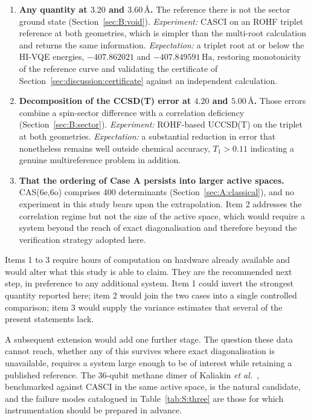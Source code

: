 \documentclass[11pt,a4paper]{article}
\newcommand{\Ha}{\ensuremath{\,\mathrm{Ha}}}
\newcommand{\Ang}{\ensuremath{\,\text{\AA}}}
\begin{document}
\begin{enumerate}[leftmargin=1.5em,itemsep=6pt]
\item \textbf{Any quantity at $3.20$ and $3.60\Ang$.}
The reference there is not the sector ground state
(Section~\ref{sec:B:void}). \emph{Experiment:} CASCI on an ROHF triplet
reference at both geometries, which is simpler than the multi-root calculation
and returns the same information. \emph{Expectation:} a triplet root at or
below the HI-VQE energies, $-407.862021$ and $-407.849591\Ha$, restoring
monotonicity of the reference curve and validating the certificate of
Section~\ref{sec:discussion:certificate} against an independent calculation.

\item \textbf{Decomposition of the CCSD(T) error at $4.20$ and $5.00\Ang$.}
Those errors combine a spin-sector difference with a correlation deficiency
(Section~\ref{sec:B:sector}). \emph{Experiment:} ROHF-based UCCSD(T) on the
triplet at both geometries. \emph{Expectation:} a substantial reduction in
error that nonetheless remains well outside chemical accuracy, $T_1 > 0.11$
indicating a genuine multireference problem in addition.

\item \textbf{That the ordering of Case A persists into larger active spaces.}
CAS(6e,6o) comprises 400 determinants (Section~\ref{sec:A:classical}), and no
experiment in this study bears upon the extrapolation. Item 2 addresses the
correlation regime but not the size of the active space, which would require a
system beyond the reach of exact diagonalisation and therefore beyond the
verification strategy adopted here.

\end{enumerate}

Items 1 to 3 require hours of computation on hardware already available and
would alter what this study is able to claim. They are the recommended next
step, in preference to any additional system. Item 1 could invert the strongest
quantity reported here; item 2 would join the two cases into a single
controlled comparison; item 3 would supply the variance estimates that several
of the present statements lack.

A subsequent extension would add one further stage. The question these data
cannot reach, whether any of this survives where exact diagonalisation is
unavailable, requires a system large enough to be of interest while retaining a
published reference. The 36-qubit methane dimer of Kaliakin \emph{et
al.}~\cite{sqd}, benchmarked against CASCI in the same active space, is the
natural candidate, and the failure modes catalogued in
Table~\ref{tab:S:three} are those for which instrumentation should be prepared
in advance.
\end{document}
